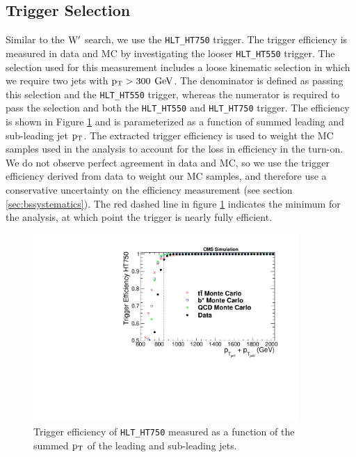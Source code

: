 \subsection{Trigger Selection}
\label{sec:bstrigger}
Similar to the $\mathrm{W}^{\prime}$ search, we use the \texttt{HLT\_HT750} trigger. 
The trigger efficiency is measured in data and MC by investigating the looser \texttt{HLT\_HT550} trigger.  The selection used for this measurement includes a 
loose kinematic selection in which we require two jets with $\mathrm{p_{T}} > 300$ $\mathrm{GeV}$.
The denominator is defined as passing this selection and the \texttt{HLT\_HT550} trigger, whereas the 
numerator is required to pass the selection and both the \texttt{HLT\_HT550} and \texttt{HLT\_HT750} trigger.  
The efficiency is shown in Figure \ref{figs:bsTrigger_Comparison_Ht} and is parameterized as a function of summed leading and sub-leading jet $\mathrm{p_{T}}$.  The extracted trigger efficiency is used to weight 
the MC samples used in the analysis to account for the loss in efficiency in the turn-on.  We do not observe perfect agreement in data and MC, 
so we use the trigger efficiency derived from data to weight our MC samples, and therefore use a conservative uncertainty on the efficiency measurement (see section \ref{sec:bssystematics}).  
The red dashed line in figure \ref{figs:bsTrigger_Comparison_Ht} indicates the minimum for the analysis, 
at which point the trigger is nearly fully efficient.

\begin{figure}[htcb]
\centering
\includegraphics[width=0.9\textwidth]{AN-14-049/figs/Trigger_Comparison_Htdijet.pdf}
\caption{Trigger efficiency of \texttt{HLT\_HT750} measured as a function of the summed $\mathrm{p_{T}}$ of the leading and sub-leading jets.  }
\label{figs:bsTrigger_Comparison_Ht}
\end{figure}

